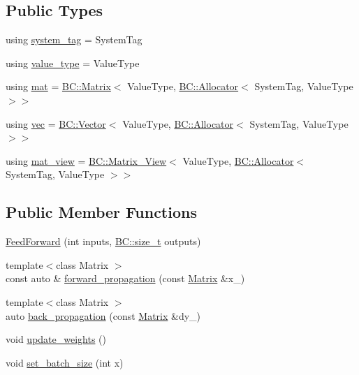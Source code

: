 \subsection*{Public Types}
\begin{DoxyCompactItemize}
\item 
using \hyperlink{classBC_1_1nn_1_1FeedForward_a91e5b58a7c6d5cb02460cc0b27ea0f51}{system\+\_\+tag} = System\+Tag
\item 
using \hyperlink{classBC_1_1nn_1_1FeedForward_ac38f49be968436c2db3a6f96517c36d7}{value\+\_\+type} = Value\+Type
\item 
using \hyperlink{classBC_1_1nn_1_1FeedForward_aa9d6dd34a3d6e7c67bfc9d234e068d2d}{mat} = \hyperlink{namespaceBC_1_1tensors_1_1common__using_a6fc3153d379a42b1a97df46ed5b71a29}{B\+C\+::\+Matrix}$<$ Value\+Type, \hyperlink{namespaceBC_a934f94b17b06290e6b241e5f59930c5f}{B\+C\+::\+Allocator}$<$ System\+Tag, Value\+Type $>$$>$
\item 
using \hyperlink{classBC_1_1nn_1_1FeedForward_ade4e53b38558345c7bb0844fe6bf5e9b}{vec} = \hyperlink{namespaceBC_1_1tensors_1_1common__using_ab2d6784064c0dda8aef3c2a9177ffa77}{B\+C\+::\+Vector}$<$ Value\+Type, \hyperlink{namespaceBC_a934f94b17b06290e6b241e5f59930c5f}{B\+C\+::\+Allocator}$<$ System\+Tag, Value\+Type $>$$>$
\item 
using \hyperlink{classBC_1_1nn_1_1FeedForward_aeb218c59bd13c7f136ad98f9fef7782e}{mat\+\_\+view} = \hyperlink{namespaceBC_1_1tensors_1_1common__using_a2ef3cf5721d0ae966c30051cbe6f24b6}{B\+C\+::\+Matrix\+\_\+\+View}$<$ Value\+Type, \hyperlink{namespaceBC_a934f94b17b06290e6b241e5f59930c5f}{B\+C\+::\+Allocator}$<$ System\+Tag, Value\+Type $>$$>$
\end{DoxyCompactItemize}
\subsection*{Public Member Functions}
\begin{DoxyCompactItemize}
\item 
\hyperlink{classBC_1_1nn_1_1FeedForward_aa3bba5d4f40eca8aba17adcc6c6dcb99}{Feed\+Forward} (int inputs, \hyperlink{namespaceBC_a6007cbc4eeec401a037b558910a56173}{B\+C\+::size\+\_\+t} outputs)
\item 
{\footnotesize template$<$class Matrix $>$ }\\const auto \& \hyperlink{classBC_1_1nn_1_1FeedForward_ada6fe0456206043fe14f73314fe71793}{forward\+\_\+propagation} (const \hyperlink{namespaceBC_1_1tensors_1_1common__using_a6fc3153d379a42b1a97df46ed5b71a29}{Matrix} \&x\+\_\+)
\item 
{\footnotesize template$<$class Matrix $>$ }\\auto \hyperlink{classBC_1_1nn_1_1FeedForward_a994bc64fefccdbc0b9e7d49aec15e039}{back\+\_\+propagation} (const \hyperlink{namespaceBC_1_1tensors_1_1common__using_a6fc3153d379a42b1a97df46ed5b71a29}{Matrix} \&dy\+\_\+)
\item 
void \hyperlink{classBC_1_1nn_1_1FeedForward_a4d21f002b18731b7e3f26c63a82d5ae4}{update\+\_\+weights} ()
\item 
void \hyperlink{classBC_1_1nn_1_1FeedForward_a41251313514994440f61cf861b891a05}{set\+\_\+batch\+\_\+size} (int x)
\end{DoxyCompactItemize}


